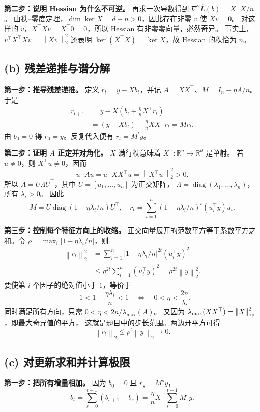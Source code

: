 \documentclass[UTF8,a4paper,11pt,fontset=fandol]{ctexart}
\newcommand{\R}{\mathbb R}
\newcommand{\norm}[1]{\left\lVert#1\right\rVert}
\begin{document}
\textbf{第二步：说明 Hessian 为什么不可逆。}
再求一次导数得到 $\nabla^2\widehat L(b)=X^\top X/n$。
由秩--零度定理，$\dim\ker X=d-n>0$，因此存在非零 $v$ 使 $Xv=0$。
对这样的 $v$，$X^\top Xv=X^\top0=0$，所以 Hessian 有非零零向量，必然奇异。
事实上，$v^\top X^\top Xv=\norm{Xv}_2^2$ 还表明
$\ker(X^\top X)=\ker X$，故 Hessian 的秩恰为 $n$。

\subsection*{(b) 残差递推与谱分解}
\textbf{第一步：推导残差递推。}
定义 $r_t=y-Xb_t$，并记 $A=XX^\top$、$M=I_n-\eta A/n$。于是
\begin{align*}
 r_{t+1}
 &=y-X\left(b_t+\frac\eta nX^\top r_t\right)\\
 &=(y-Xb_t)-\frac\eta nXX^\top r_t
 =Mr_t.
\end{align*}
由 $b_0=0$ 得 $r_0=y$。反复代入便有 $r_t=M^t y$。

\textbf{第二步：证明 $A$ 正定并对角化。}
$X$ 满行秩意味着 $X^\top:\R^n\to\R^d$ 是单射。
若 $u\ne0$，则 $X^\top u\ne0$，因而
\[
 u^\top Au=u^\top XX^\top u=\norm{X^\top u}_2^2>0.
\]
所以 $A=U\Lambda U^\top$，其中 $U=[u_1,\ldots,u_n]$ 为正交矩阵，
$\Lambda=\operatorname{diag}(\lambda_1,\ldots,\lambda_n)$，所有 $\lambda_i>0$。
因此
\[
 M=U\operatorname{diag}(1-\eta\lambda_i/n)U^\top,
 \quad
 r_t=\sum_{i=1}^n(1-\eta\lambda_i/n)^t(u_i^\top y)u_i.
\]

\textbf{第三步：控制每个特征方向上的收缩。}
正交向量展开的范数平方等于系数平方之和。令
$\rho=\max_i|1-\eta\lambda_i/n|$，则
\begin{align*}
 \norm{r_t}_2^2
 &=\sum_{i=1}^n|1-\eta\lambda_i/n|^{2t}(u_i^\top y)^2\\
 &\leq\rho^{2t}\sum_{i=1}^n(u_i^\top y)^2
 =\rho^{2t}\norm y_2^2.
\end{align*}
要使第 $i$ 个因子的绝对值小于 $1$，等价于
\[
 -1<1-\frac{\eta\lambda_i}{n}<1
 \quad\Longleftrightarrow\quad
 0<\eta<\frac{2n}{\lambda_i}.
\]
同时满足所有方向，只需 $0<\eta<2n/\lambda_{\max}(A)$。
又因为 $\lambda_{\max}(XX^\top)=\norm X_{\rm op}^2$，即最大奇异值的平方，
这就是题目中的步长范围。两边开平方可得
\[
 \boxed{\norm{r_t}_2\leq\rho^t\norm y_2\longrightarrow0.}
\]

\subsection*{(c) 对更新求和并计算极限}
\textbf{第一步：把所有增量相加。}
因为 $b_0=0$ 且 $r_s=M^s y$，
\[
 b_t=\sum_{s=0}^{t-1}(b_{s+1}-b_s)
 =\frac\eta nX^\top\sum_{s=0}^{t-1}M^s y.
\]
\end{document}
